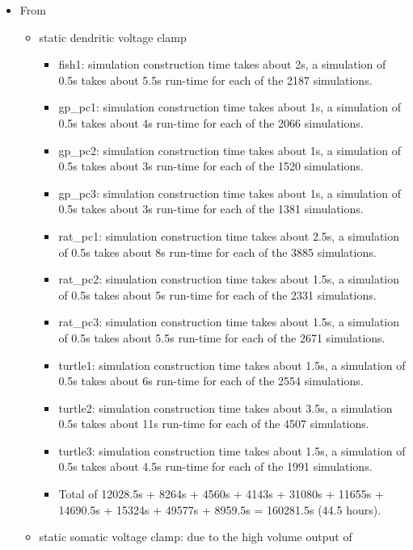 \documentclass[12pt]{article}
\begin{document}
\begin{itemize}
\item From~\cite{bower09:_compar_evolut_comput_analy_cereb}
  \begin{itemize}
  \item static dendritic voltage clamp
    \begin{itemize}
    \item fish1: simulation construction time takes about 2s, a
      simulation of 0.5s takes about 5.5s run-time for each of the
      2187 simulations.
    \item gp\_pc1: simulation construction time takes about 1s, a
      simulation of 0.5s takes about 4s run-time for each of the 2066
      simulations.
    \item gp\_pc2: simulation construction time takes about 1s, a
      simulation of 0.5s takes about 3s run-time for each of the 1520
      simulations.
    \item gp\_pc3: simulation construction time takes about 1s, a
      simulation of 0.5s takes about 3s run-time for each of the 1381
      simulations.
    \item rat\_pc1: simulation construction time takes about 2.5s, a
      simulation of 0.5s takes about 8s run-time for each of the 3885
      simulations.
    \item rat\_pc2: simulation construction time takes about 1.5s, a
      simulation of 0.5s takes about 5s run-time for each of the 2331
      simulations.
    \item rat\_pc3: simulation construction time takes about 1.5s, a
      simulation of 0.5s takes about 5.5s run-time for each of the
      2671 simulations.
    \item turtle1: simulation construction time takes about 1.5s, a
      simulation of 0.5s takes about 6s run-time for each of the 2554
      simulations.
    \item turtle2: simulation construction time takes about 3.5s, a
      simulation 0.5s takes about 11s run-time for each of the 4507
      simulations.
    \item turtle3: simulation construction time takes about 1.5s, a
      simulation of 0.5s takes about 4.5s run-time for each of the
      1991 simulations.
    \item Total of 12028.5s + 8264s + 4560s + 4143s + 31080s + 11655s
      + 14690.5s + 15324s + 49577s + 8959.5s = 160281.5s (44.5 hours).
    \end{itemize}
  \item static somatic voltage clamp: due to the high volume output of

\end{itemize}
\end{itemize}
\end{document}

